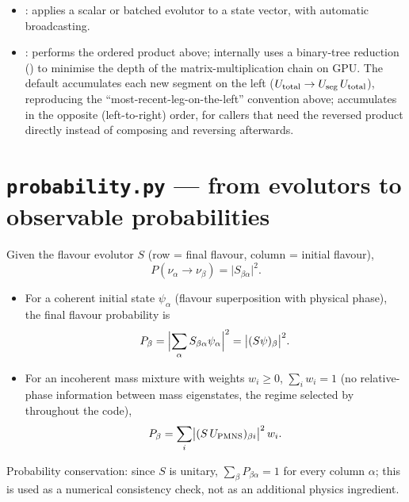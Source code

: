 \begin{implbox}
\begin{itemize}
  \item {}: applies a scalar or
    batched evolutor to a state vector, with automatic broadcasting.
  \item {}: performs the ordered product above; internally uses a
    binary-tree reduction () to minimise
    the depth of the matrix-multiplication chain on GPU. The default
     accumulates each new segment on the left
    ($U_{\rm total}\to U_{\rm seg}\,U_{\rm total}$), reproducing the
    ``most-recent-leg-on-the-left'' convention above; 
    accumulates in the opposite (left-to-right) order, for callers that need
    the reversed product directly instead of composing and reversing
    afterwards.
\end{itemize}
\end{implbox}

\section{\texttt{probability.py} --- from evolutors to observable probabilities}


\begin{theorybox}
Given the flavour evolutor $S$ (row = final flavour, column = initial
flavour),
\begin{equation}
  P(\nu_\alpha\to\nu_\beta) = \bigl|S_{\beta\alpha}\bigr|^2.
\end{equation}
\begin{itemize}
  \item For a coherent initial state $\psi_\alpha$ (flavour superposition with
physical phase), the final flavour probability is
\begin{equation}
  P_\beta = \Bigl|\sum_\alpha S_{\beta\alpha}\psi_\alpha\Bigr|^2
          = \bigl|(S\psi)_\beta\bigr|^2.
\end{equation}
\item For an incoherent mass mixture with weights $w_i\geq0$, $\sum_i w_i=1$
(no relative-phase information between mass eigenstates, the regime selected
by  throughout the code),
\begin{equation}
  P_\beta = \sum_i \bigl|(S\,U_{\rm PMNS})_{\beta i}\bigr|^2\, w_i .
\end{equation}
\end{itemize}
Probability conservation: since $S$ is unitary, $\sum_\beta P_{\beta\alpha}=1$
for every column $\alpha$; this is used as a numerical consistency check,
not as an additional physics ingredient.
\end{theorybox}

